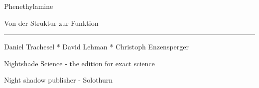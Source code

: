 {%
	Phenethylamine
	
	Von der Struktur zur Funktion
	
	\noindent\rule{\textwidth}{1pt}
	Daniel Trachesel * David Lehman * Christoph Enzensperger
	
	Nightshade Science - the edition for exact science
	
	Night shadow publisher - Solothurn
}